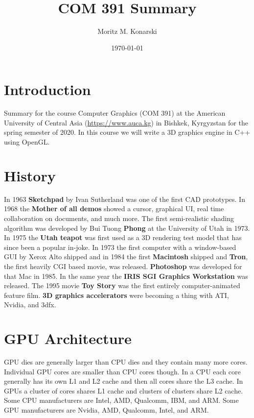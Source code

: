\documentclass[a4paper,11pt]{amsart}
\begin{document}
\title{COM 391 Summary}
\author{Moritz M. Konarski}
\date{\today}

\maketitle
\tableofcontents

\section{Introduction}

Summary for the course Computer Graphics (COM 391) at the American University 
of Central Asia (\url{https://www.auca.kg}) in Bishkek, Kyrgyzstan for the 
spring semester of 2020. In this course we will write a 3D graphics engine in 
C++ using OpenGL.

\section{History}

In 1963 \textbf{Sketchpad} by Ivan Sutherland was one of the first CAD 
prototypes. In 1968 the \textbf{Mother of all demos} showed a cursor, graphical 
UI, real time collaboration on documents, and much more. The first
semi-realistic shading algorithm was developed by Bui Tuong \textbf{Phong} at
the University of Utah in 1973. In 1975 the \textbf{Utah teapot} was first used 
as a 3D rendering test model that has since been a popular in-joke. In 1973 the 
first computer with a window-based GUI by Xerox Alto shipped and in 1984 the 
first \textbf{Macintosh} shipped and \textbf{Tron}, the first heavily CGI based
movie, was released. \textbf{Photoshop} was developed for that Mac in 1985. In 
the same year the \textbf{IRIS SGI Graphics Workstation} was released. The 1995
movie \textbf{Toy Story} was the first entirely computer-animated feature film.
\textbf{3D graphics accelerators} were becoming a thing with ATI, Nvidia, and 
3dfx.

\section{GPU Architecture}

GPU dies are generally larger than CPU dies and they contain many more cores.
Individual GPU cores are smaller than CPU cores though. In a CPU each core
generally has its own L1 and L2 cache and then all cores share the L3 cache. In
GPUs a cluster of cores shares L1 cache and clusters of clusters share L2
cache. Some CPU manufacturers are Intel, AMD, Qualcomm, IBM, and ARM. Some GPU
manufacturers are Nvidia, AMD, Qualcomm, Intel, and ARM.
\end{document}
